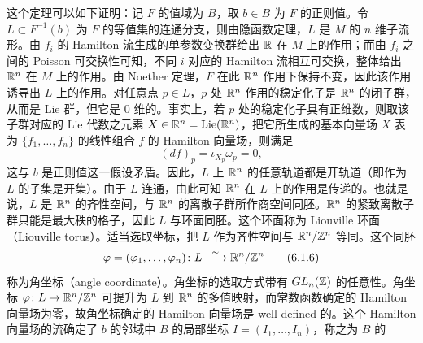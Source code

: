 这个定理可以如下证明：记 $F$ 的值域为 $B$，取 $b\in B$ 为 $F$ 的正则值。令 $L\subset F^{-1}(b)$ 为 $F$ 的等值集的连通分支，则由隐函数定理，$L$ 是 $M$ 的 $n$ 维子流形。由 $f_i$ 的 Hamilton 流生成的单参数变换群给出 $\mathbb{R}$ 在 $M$ 上的作用；而由 $f_i$ 之间的 Poisson 可交换性可知，不同 $i$ 对应的 Hamilton 流相互可交换，整体给出 $\mathbb{R}^n$ 在 $M$ 上的作用。由 Noether 定理，$F$ 在此 $\mathbb{R}^n$ 作用下保持不变，因此该作用诱导出 $L$ 上的作用。对任意点 $p\in L$，$p$ 处 $\mathbb{R}^n$ 作用的稳定化子是 $\mathbb{R}^n$ 的闭子群，从而是 Lie 群，但它是 $0$ 维的。事实上，若 $p$ 处的稳定化子具有正维数，则取该子群对应的 Lie 代数之元素 $X\in\mathbb{R}^n=\operatorname{Lie}(\mathbb{R}^n)$，把它所生成的基本向量场 $X$ 表为 $\{f_1,\dots,f_n\}$ 的线性组合 $f$ 的 Hamilton 向量场，则满足
\begin{equation}
  (df)_p=\iota_{X_p}\omega_p=0,
  \tag{6.1.5}
\end{equation}
这与 $b$ 是正则值这一假设矛盾。因此，$L$ 上 $\mathbb{R}^n$ 的任意轨道都是开轨道（即作为 $L$ 的子集是开集）。由于 $L$ 连通，由此可知 $\mathbb{R}^n$ 在 $L$ 上的作用是传递的。也就是说，$L$ 是 $\mathbb{R}^n$ 的齐性空间，与 $\mathbb{R}^n$ 的离散子群所作商空间同胚。$\mathbb{R}^n$ 的紧致离散子群只能是最大秩的格子，因此 $L$ 与环面同胚。这个环面称为 Liouville 环面（Liouville torus）。适当选取坐标，把 $L$ 作为齐性空间与 $\mathbb{R}^n/\mathbb{Z}^n$ 等同。这个同胚
\begin{equation}
  \varphi=(\varphi_1,\dots,\varphi_n)\colon L\xrightarrow{\ \sim\ }\mathbb{R}^n/\mathbb{Z}^n
  \tag{6.1.6}
\end{equation}
称为角坐标（angle coordinate）。角坐标的选取方式带有 $GL_n(\mathbb{Z})$ 的任意性。角坐标 $\varphi\colon L\to\mathbb{R}^n/\mathbb{Z}^n$ 可提升为 $L$ 到 $\mathbb{R}^n$ 的多值映射，而常数函数确定的 Hamilton 向量场为零，故角坐标确定的 Hamilton 向量场是 well-defined 的。这个 Hamilton 向量场的流确定了 $b$ 的邻域中 $B$ 的局部坐标 $I=(I_1,\dots,I_n)$，称之为 $B$ 的

